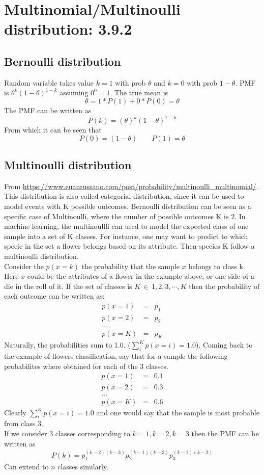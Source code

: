 \documentclass{article}
\newcommand{\beq}{\begin{equation}}
\newcommand{\eeq}{\end{equation}}
\newcommand{\ber}{\begin{eqnarray}}
\newcommand{\eer}{\end{eqnarray}}
\begin{document}
\section{ Multinomial/Multinoulli distribution: 3.9.2 }
\subsection{Bernoulli distribution}
Random variable takes value $k=1$ with prob $\theta$ and $k=0$ with prob $1-\theta$. PMF is $\theta^k(1-\theta)^{1-k}$ assuming $0^0=1$. The true mean is
\beq
\theta = 1*P(1) + 0*P(0) = \theta
\eeq
The PMF can be written as
\beq
P(k) = (\theta)^k(1-\theta)^{1-k}
\eeq
From which it can be seen that
\beq
P(0) = (1-\theta) \qquad P(1) = \theta
\eeq
\subsection{Multinoulli distribution}
From \url{https://www.euanrussano.com/post/probability/multinoulli_multinomial/}.
This distribution is also called categorial distribution, since it can be used to model events with K possible outcomes. Bernoulli distribution can be seen as a specific case of Multinoulli, where the number of possible outcomes K is 2. In machine learning, the multinoullli can used to model the expected class of one sample into a set of K classes. For instance, one may want to predict to which specie  in the set  a flower belongs based on its attribute. Then species K follow a multinoulli distribution.\\
Consider the $p(x=k)$ the probability that the sample $x$ belongs to class k. Here  $x$ could be the attributes of a flower in the example above, or one side of a die in the roll of it. If the set of classes is $K \,\in \, 1,2,3,\cdots,K$ then the probability of each outcome can be written as:
\ber
p(x=1) &=& p_1\\
p(x=2) &=& p_2\\
... & &\\
p(x=K) &=& p_K
\eer
Naturally, the probabilities sum to 1.0. ($\sum_{i}^{K}p(x=i)=1.0$). Coming back to the example of flowers classification, say that for a sample  the following probabilites where obtained for each of the 3 classes.
\ber
p(x=1) &=& 0.1\\
p(x=2) &=& 0.3\\
... & &\\
p(x=K) &=& 0.6
\eer
Clearly $\sum_{i}^{K}p(x=i)=1.0$ and one would say that the sample is most probable from class 3.\\
If we consider 3 classes corresponding to $k=1,k=2,k=3$ then the PMF can be written as
\ber
P(k)=p_1^{(k-2)(k-3)}p_2^{(k-1)(k-3)}p_3^{(k-1)(k-2)}
\eer
Can extend to $n$ classes similarly.
\end{document}
